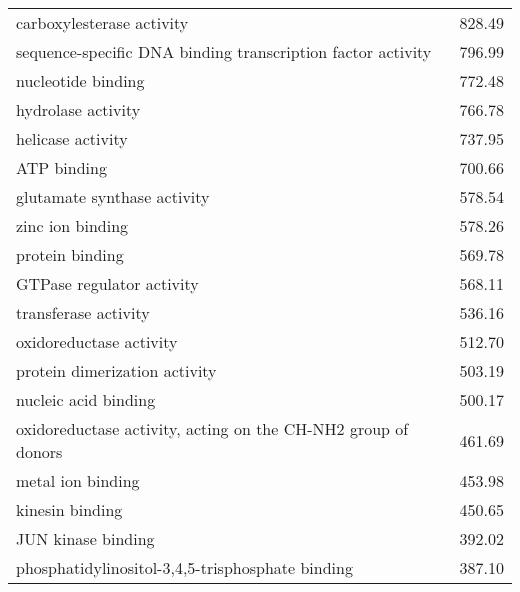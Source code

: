 \begin{table}[h]
\begin{center}
\begin{tabular}{p{}r}
carboxylesterase activity                                     & 828.49                      \\
sequence-specific DNA binding transcription factor activity   & 796.99                      \\ %
nucleotide binding                                            & 772.48                      \\ %
hydrolase activity                                            & 766.78                      \\
helicase activity                                             & 737.95                      \\ %
ATP binding                                                   & 700.66                      \\
glutamate synthase activity                                   & 578.54                      \\
zinc ion binding                                              & 578.26                      \\ %
protein binding                                               & 569.78                      \\
GTPase regulator activity                                     & 568.11                      \\
transferase activity                                          & 536.16                      \\
oxidoreductase activity                                       & 512.70                      \\
protein dimerization activity                                 & 503.19                      \\
nucleic acid binding                                          & 500.17                      \\
oxidoreductase activity, acting on the CH-NH2 group of donors & 461.69                      \\
metal ion binding                                             & 453.98                      \\
kinesin binding                                               & 450.65                      \\
JUN kinase binding                                            & 392.02                      \\ %
phosphatidylinositol-3,4,5-trisphosphate binding              & 387.10                      \\

\end{tabular}
\end{center}
\end{table}

